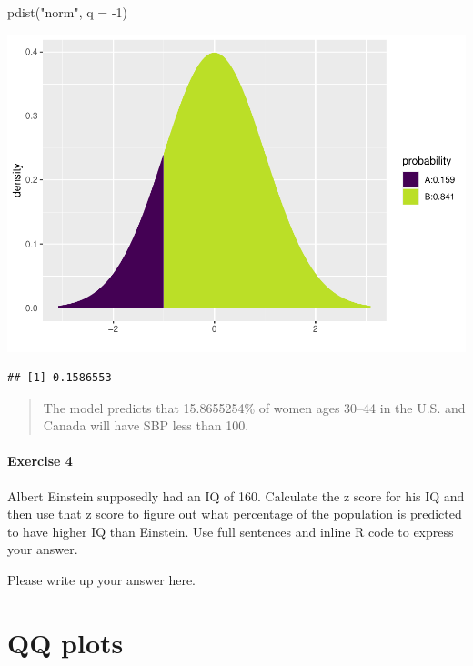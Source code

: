 \documentclass[
]{book}
\newenvironment{Shaded}{\begin{snugshade}}{\end{snugshade}}
\newcommand{\AttributeTok}[1]{\textcolor[rgb]{0.77,0.63,0.00}{#1}}
\newcommand{\DecValTok}[1]{\textcolor[rgb]{0.00,0.00,0.81}{#1}}
\newcommand{\FunctionTok}[1]{\textcolor[rgb]{0.00,0.00,0.00}{#1}}
\newcommand{\NormalTok}[1]{#1}
\newcommand{\SpecialCharTok}[1]{\textcolor[rgb]{0.00,0.00,0.00}{#1}}
\newcommand{\StringTok}[1]{\textcolor[rgb]{0.31,0.60,0.02}{#1}}
\begin{document}
\begin{Shaded}
\begin{Highlighting}[]
\FunctionTok{pdist}\NormalTok{(}\StringTok{"norm"}\NormalTok{, }\AttributeTok{q =} \SpecialCharTok{{-}}\DecValTok{1}\NormalTok{)}
\end{Highlighting}
\end{Shaded}

\includegraphics{intro_stats_files/figure-latex/unnamed-chunk-356-1.pdf}

\begin{verbatim}
## [1] 0.1586553
\end{verbatim}

\begin{quote}
The model predicts that 15.8655254\% of women ages 30--44 in the U.S. and Canada will have SBP less than 100.
\end{quote}

\hypertarget{exercise-4-7}{%
\paragraph*{Exercise 4}\label{exercise-4-7}}

Albert Einstein supposedly had an IQ of 160. Calculate the z score for his IQ and then use that z score to figure out what percentage of the population is predicted to have higher IQ than Einstein. Use full sentences and inline R code to express your answer.

Please write up your answer here.

\hypertarget{normal-qq}{%
\section{QQ plots}\label{normal-qq}}
\end{document}
